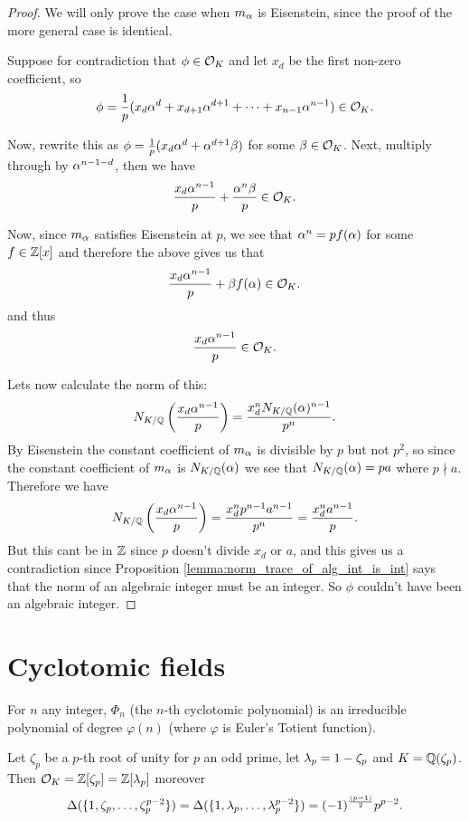 \begin{proof}
	We will only prove the case when $m_\alpha$ is Eisenstein, since the proof of the more general case is identical.

	Suppose for contradiction that $\phi \in \mathcal{O}_K$ and let $x_d$ be the first non-zero coefficient, so \[\phi=\frac{1}{p}(x_d\alpha^d+x_{d+1}\alpha^{d+1}+\cdots+x_{n-1}\alpha^{n-1}) \in \mathcal{O}_K.\]

	Now, rewrite this as $\phi=\frac{1}{p}(x_d\alpha^d +\alpha^{d+1}\beta)$ for some $\beta \in \mathcal{O}_K$. Next, multiply through by $\alpha^{n-1-d}$, then we have \[\frac{x_d\alpha^{n-1}}{p}+\frac{\alpha^n\beta}{p} \in \mathcal{O}_K.\]

	Now, since  $m_\alpha$ satisfies Eisenstein at $p$, we see that $\alpha^n=pf(\alpha)$ for some $f \in \mathbb{Z}[x]$ and therefore the above gives us that \[\frac{x_d\alpha^{n-1}}{p}+\beta f(\alpha) \in \mathcal{O}_K.\] and thus \[\frac{x_d\alpha^{n-1}}{p} \in \mathcal{O}_K.\]

	Lets now calculate the norm of this: \[N_{K/\mathbb{Q}} \left(\frac{x_d\alpha^{n-1}}{p} \right)=\frac{x_d^n N_{K/\mathbb{Q}}(\alpha)^{n-1}}{p^n}.\] By Eisenstein the constant coefficient of $m_\alpha$ is divisible by $p$ but not $p^2$, so since the constant coefficient of $m_\alpha$ is $N_{K/\mathbb{Q}}(\alpha)$ we see that $N_{K/\mathbb{Q}}(\alpha)=p a$ where $p \nmid a$. Therefore we have \[N_{K/\mathbb{Q}} \left(\frac{x_d\alpha^{n-1}}{p} \right)=\frac{x_d^n p^{n-1}a^{n-1}}{p^n}= \frac{x_d^n a^{n-1}}{p}.\] But this cant be in $\mathbb{Z}$ since $p$ doesn't divide $x_d$ or $a$, and this gives us a contradiction since  Proposition \ref{lemma:norm_trace_of_alg_int_is_int} says that the norm of an algebraic integer must be an integer. So $\phi$ couldn't have been an algebraic integer.


\end{proof}

\section{Cyclotomic fields}


\begin{lemma}\label{lemma:cyclo_poly}\mathlibok
	For $n$ any integer, $\Phi_n$ (the $n$-th cyclotomic polynomial) is an irreducible polynomial of degree $\varphi(n)$ (where $\varphi$ is Euler's Totient function).
\end{lemma}




\begin{theorem}\label{theorem:ring_of_ints_of_cyclo}
	Let $\zeta_p$ be a $p$-th root of unity for $p$ an odd prime, let $\lambda_p=1-\zeta_p$ and $K=\mathbb{Q}(\zeta_p)$. Then $\mathcal{O}_K=\mathbb{Z}[\zeta_p]=\mathbb{Z}[\lambda_p]$ moreover \[\Delta(\{1,\zeta_p,\dots,\zeta_p^{p-2}\})=\Delta(\{1,\lambda_p,\dots,\lambda_p^{p-2}\})=(-1)^{\frac{(p-1)}{2}}p^{p-2}.\]
\end{theorem}

